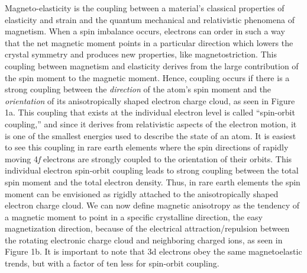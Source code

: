 \documentclass[../Thesis_Proposal_Outline.tex]{subfiles}
\begin{document}
	Magneto-elasticity is the coupling between a material’s classical properties of elasticity and strain and the quantum mechanical and relativistic phenomena of magnetism.  When a spin imbalance occurs, electrons can order in such a way that the net magnetic moment points in a particular direction which lowers the crystal symmetry and produces new properties, like magnetostriction.\cite{Breu2008} This coupling between magnetism and elasticity derives from the large contribution of the spin moment to the magnetic moment.  Hence, coupling occurs if there is a strong coupling between the \textit{direction} of the atom’s spin moment and the \textit{orientation} of its anisotropically shaped electron charge cloud, as seen in Figure 1a.  This coupling that exists at the individual electron level is called “spin-orbit coupling,” and since it derives from relativistic aspects of the electron motion, it is one of the smallest energies used to describe the state of an atom.  It is easiest to see this coupling in rare earth elements where the spin directions of rapidly moving 4\textit{f} electrons are strongly coupled to the orientation of their orbits.  This individual electron spin-orbit coupling leads to strong coupling between the total spin moment and the total electron density.  Thus, in rare earth elements the spin moment can be envisioned as rigidly attached to the anisotropically shaped electron charge cloud.  We can now define magnetic anisotropy as the tendency of a magnetic moment to point in a specific crystalline direction, the easy magnetization direction, because of the electrical attraction/repulsion between the rotating electronic charge cloud and neighboring charged ions, as seen in Figure 1b.  It is important to note that 3d electrons obey the same magnetoelastic trends, but with a factor of ten less for spin-orbit coupling.\cite{Engdahl1999}
\end{document}

